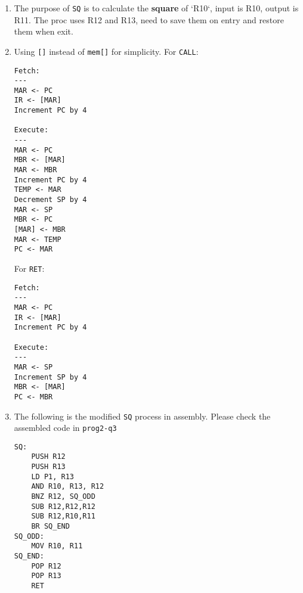 \documentclass{article}
\begin{document}
\newcommand{\documentcourse}{COMP2120}
\newcommand{\documentnumber}{4}




\begin{enumerate}
    \item The purpose of \texttt{SQ} is to calculate the \textbf{square} of `R10`, input is R10, output is R11. The proc uses R12 and R13, need to save them on entry and restore them when exit.
    \item Using \texttt{[]} instead of \texttt{mem[]} for simplicity. For \texttt{CALL}:
          \begin{verbatim}
Fetch:
---
MAR <- PC
IR <- [MAR]
Increment PC by 4
    
Execute:  
---
MAR <- PC
MBR <- [MAR]
MAR <- MBR​
Increment PC by 4
TEMP <- MAR
Decrement SP by 4
MAR <- SP
MBR <- PC
[MAR] <- MBR
MAR <- TEMP
PC <- MAR 
\end{verbatim}
          For \texttt{RET}:
          \begin{verbatim}
Fetch:
---
MAR <- PC
IR <- [MAR]
Increment PC by 4

Execute:  
---
MAR <- SP
Increment SP by 4
MBR <- [MAR]
PC <- MBR
\end{verbatim}
    \item The following is the modified \texttt{SQ} process in assembly. Please check the assembled code in \texttt{prog2-q3}
          \begin{verbatim}
SQ: 
    PUSH R12
    PUSH R13
    LD P1, R13
    AND R10, R13, R12
    BNZ R12, SQ_ODD
    SUB R12,R12,R12
    SUB R12,R10,R11
    BR SQ_END
SQ_ODD:
    MOV R10, R11
SQ_END:
    POP R12
    POP R13
    RET
    \end{verbatim}
\end{enumerate}
\end{document}
